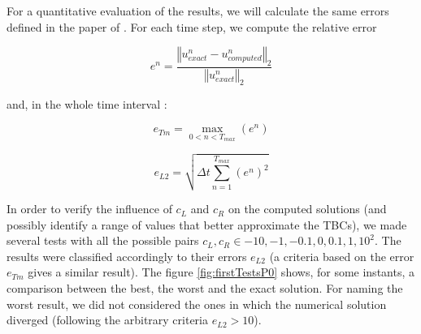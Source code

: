 \indent For a quantitative evaluation of the results, we will calculate the same errors defined in the paper of \cite{besse2015}. For each time step, we compute the relative error

$$e^n = \frac{\left\Vert u_{exact}^n - u_{computed}^n\right\Vert_2}{\left\Vert u_{exact}^n\right\Vert_2}$$

\noindent and, in the whole time interval :

$$ e_{Tm} = \max\limits_{0 < n < T_{max}} (e^n) $$

$$ e_{L2} = \sqrt{ \Delta t \sum_{n=1}^{T_{max}} (e^n)^2 } $$

\indent In order to verify the influence of $c_L$ and $c_R$ on the computed solutions (and possibly identify a range of values that better approximate the TBCs), we made several tests with all the possible pairs $c_L,c_R \in {-10,-1,-0.1,0,0.1,1,10}^2$. The results were classified accordingly to their errors $e_{L2}$ (a criteria based on the error $e_{Tm}$ gives a similar result). The figure \ref{fig:firstTestsP0} shows, for some instants, a comparison between the best, the worst and the exact solution. For naming the worst result, we did not considered the ones in which the numerical solution diverged (following the arbitrary criteria $e_{L2} > 10$). 

